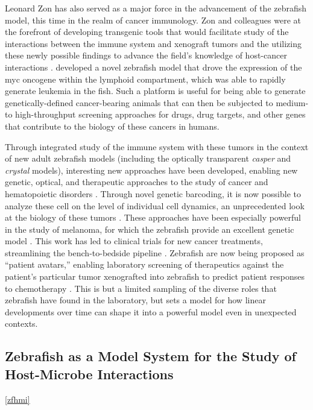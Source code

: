 Leonard Zon has also served as a major force in the advancement of the zebrafish model, this time in the realm of cancer immunology. Zon and colleagues were at the forefront of developing transgenic tools that would facilitate study of the interactions between the immune system and xenograft tumors and the utilizing these newly possible findings to advance the field's knowledge of host-cancer interactions \citet{Cagan2019, Amatruda2002, Trede2004, McConnell2021}. \citet{Langenau2003} developed a novel zebrafish model that drove the expression of the myc oncogene within the lymphoid compartment, which was able to rapidly generate leukemia in the fish. Such a platform is useful for being able to generate genetically-defined cancer-bearing animals that can then be subjected to medium- to high-throughput screening approaches for drugs, drug targets, and other genes that contribute to the biology of these cancers in humans. 

Through integrated study of the immune system with these tumors in the context of new adult zebrafish models (including the optically transparent \textit{casper} and \textit{crystal} models), interesting new approaches have been developed, enabling new genetic, optical, and therapeutic approaches to the study of cancer \citep{Yan2021, Yan2019, Stern2003, GomezAbenza2019, Hason2019, White2013} and hematopoietic disorders \citep{deJong2011, Tang2014}. Through novel genetic barcoding, it is now possible to analyze these cell on the level of individual cell dynamics, an unprecedented look at the biology of these tumors \citep{Sankaran2022}. These approaches have been especially powerful in the study of melanoma, for which the zebrafish provide an excellent genetic model \citep{Kaufman2016}. This work has led to clinical trials for new cancer treatments, streamlining the bench-to-bedside pipeline \citep{Hanna2021}. Zebrafish are now being proposed as ``patient avatars,'' enabling laboratory screening of therapeutics against the patient's particular tumor xenografted into zebrafish to predict patient responses to chemotherapy \citep{Li2012, Yan2019, Fazio2020, Sertori2016, Sertori2022}. This is but a limited sampling of the diverse roles that zebrafish have found in the laboratory, but sets a model for how linear developments over time can shape it into a powerful model even in unexpected contexts.

\subsection{Zebrafish as a Model System for the Study of Host-Microbe Interactions}\autoref{zfhmi}

